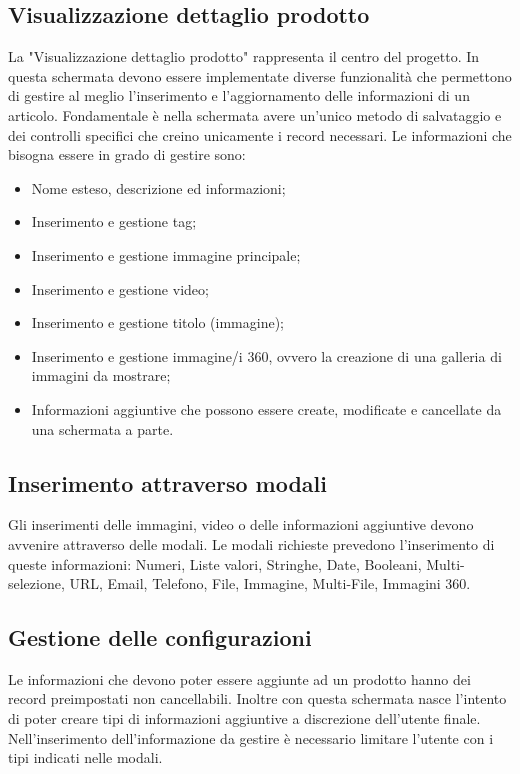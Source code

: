 \subsection{Visualizzazione dettaglio prodotto}
La "Visualizzazione dettaglio prodotto" rappresenta il centro del progetto. In questa schermata devono essere implementate diverse funzionalità che permettono di gestire al meglio l'inserimento e l'aggiornamento delle informazioni di un articolo. Fondamentale è nella schermata avere un'unico metodo di salvataggio e dei controlli specifici che creino unicamente i record necessari. 
Le informazioni che bisogna essere in grado di gestire sono:
\begin{itemize}
	\item Nome esteso, descrizione ed informazioni;
	\item Inserimento e gestione tag;
	\item Inserimento e gestione immagine principale;
	\item Inserimento e gestione video;
	\item Inserimento e gestione titolo (immagine);
	\item Inserimento e gestione immagine/i 360, ovvero la creazione di una galleria di immagini da mostrare;
	\item Informazioni aggiuntive che possono essere create, modificate e cancellate da una schermata a parte.
\end{itemize}

\subsection{Inserimento attraverso modali}
Gli inserimenti delle immagini, video o delle informazioni aggiuntive devono avvenire attraverso delle modali. Le modali richieste prevedono l'inserimento di queste informazioni: Numeri, Liste valori, Stringhe, Date, Booleani, Multi-selezione, URL, Email, Telefono, File, Immagine, Multi-File, Immagini 360.

\subsection{Gestione delle configurazioni}
Le informazioni che devono poter essere aggiunte ad un prodotto hanno dei record preimpostati non cancellabili. Inoltre con questa schermata nasce l'intento di poter creare tipi di informazioni aggiuntive a discrezione dell'utente finale.
Nell'inserimento dell'informazione da gestire è necessario limitare l'utente con i tipi indicati nelle modali.

